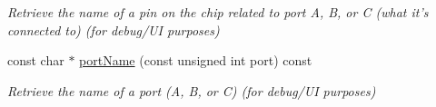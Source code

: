 \begin{DoxyCompactItemize}
\begin{DoxyCompactList}\small\item\em Retrieve the name of a pin on the chip related to port A, B, or C (what it's connected to) (for debug/\-U\-I purposes) \end{DoxyCompactList}\item 
\hypertarget{classIntel8255_a3f2f6c30bb6cb840cac73d4a83414481}{const char $\ast$ \hyperlink{classIntel8255_a3f2f6c30bb6cb840cac73d4a83414481}{port\-Name} (const unsigned int port) const }\label{classIntel8255_a3f2f6c30bb6cb840cac73d4a83414481}

\begin{DoxyCompactList}\small\item\em Retrieve the name of a port (A, B, or C) (for debug/\-U\-I purposes) \end{DoxyCompactList}\end{DoxyCompactItemize}
